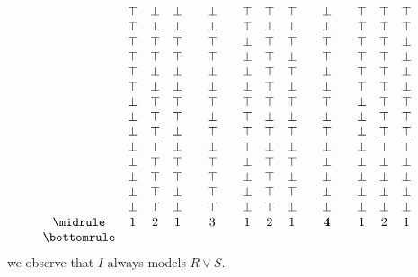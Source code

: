 \begin{myproof}
\begin{nlist}
\[\begin{array}{c c c c c c c c c c c c c c c c c}
                 & \top & \bot & \bot & 
                 & \bot &  & \top & \top & \top & 
                 & \bot &  & \top & \top & \top &  \\
                 & \top & \bot & \bot & 
                 & \bot &  & \top & \bot & \bot & 
                 & \bot &  & \top & \top & \top &  \\
                 & \top & \top & \top & 
                 & \top &  & \bot & \top & \top & 
                 & \top &  & \top & \top & \bot &  \\
                 & \top & \top & \top & 
                 & \top &  & \bot & \top & \bot & 
                 & \top &  & \top & \top & \bot &  \\
                 & \top & \bot & \bot & 
                 & \bot &  & \bot & \top & \top & 
                 & \bot &  & \top & \top & \bot &  \\
                 & \top & \bot & \bot & 
                 & \bot &  & \bot & \top & \bot & 
                 & \bot &  & \top & \top & \bot &  \\
                 & \bot & \top & \top & 
                 & \top &  & \top & \top & \top & 
                 & \top &  & \bot & \top & \top &  \\
                 & \bot & \top & \top & 
                 & \bot &  & \top & \bot & \bot & 
                 & \bot &  & \bot & \top & \top &  \\
                 & \bot & \top & \bot & 
                 & \top &  & \top & \top & \top & 
                 & \top &  & \bot & \top & \top &  \\
                 & \bot & \top & \bot & 
                 & \bot &  & \top & \bot & \bot & 
                 & \bot &  & \bot & \top & \top &  \\
                 & \bot & \top & \top & 
                 & \top &  & \bot & \top & \top & 
                 & \bot &  & \bot & \bot & \bot &  \\
                 & \bot & \top & \top & 
                 & \top &  & \bot & \top & \bot & 
                 & \bot &  & \bot & \bot & \bot &  \\
                 & \bot & \top & \bot & 
                 & \top &  & \bot & \top & \top & 
                 & \bot &  & \bot & \bot & \bot &  \\
                 & \bot & \top & \bot & 
                 & \top &  & \bot & \top & \bot & 
                 & \bot &  & \bot & \bot & \bot &  \\
                \midrule
                 & 1 & 2 & 1 & 
                 & 3 &  & 1 & 2 & 1 & 
                 & \mathbf 4 &  & 1 & 2 & 1  & \\
                \bottomrule
            \end{array}
        \]
        we observe that
        \(I\) always models \(R\vee S\).
        

\end{nlist}
\end{myproof}

